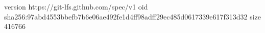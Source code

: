 version https://git-lfs.github.com/spec/v1
oid sha256:97abd4553bbefb7b6e06ae492fe1d4ff98adff29ec485d0617339e617f313d32
size 416766

